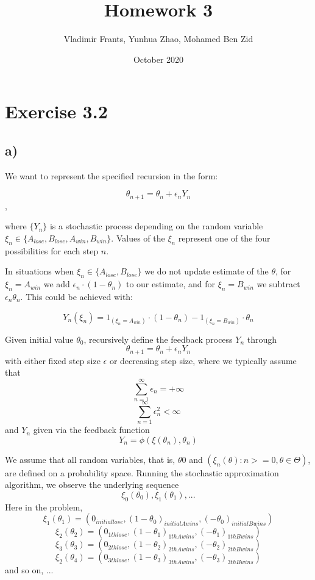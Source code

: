 \documentclass{article}
\title{Homework 3}
\author{Vladimir Frants, Yunhua Zhao, Mohamed Ben Zid}
\date{October 2020}
\begin{document}
\maketitle

\section{Exercise 3.2}

\subsection{a)} 

We want to represent the specified recursion in the form:

$$\theta_{n+1} = \theta_{n} + \epsilon_{n}Y_{n}$$, 

where $\{Y_{n}\}$ is a stochastic process depending on the random variable $\xi_{n}\in\{A_{lose}, B_{lose}, A_{win}, B_{win}\}$. Values of the $\xi_n$ represent one of the four possibilities for each step $n$.

In situations when $\xi_n\in\{A_{lose}, B_{lose}\}$ we do not update estimate of the $\theta$, for $\xi_n=A_{win}$ we add $\epsilon_{n}\cdot(1-\theta_{n})$ to our estimate, and for $\xi_{n}=B_{win}$ we subtract $\epsilon_n\theta_{n}$. This could be achieved with:

$$Y_{n}(\xi_{n})=\mathrm{1}_{(\xi_{n}=A_{win})}\cdot(1-\theta_{n}) - \mathrm{1}_{(\xi_{n}=B_{win})}\cdot\theta_{n}$$


Given initial value $\theta_0$, recursively define the feedback process ${Y_n}$ through $$ \theta_{n+1} = \theta_n+\epsilon_nY_n $$
with either fixed step size $\epsilon$ or decreasing step size, where we typically assume that 
$$ \sum_{n=1}^{\infty}\epsilon_n = +\infty $$
$$ \sum_{n=1}^{\infty}\epsilon_n^2 < \infty $$
and $Y_n$ given via the feedback function
$$ Y_n = \phi(\xi(\theta_n),\theta_n) $$
 
We assume that all random variables, that is, $\theta0$ and $ ({\xi_n(\theta):n>=0, \theta\in\Theta}) $, are defined on a probability
space. Running the stochastic approximation algorithm, we observe the underlying
sequence
$$ \xi_0(\theta_0), \xi_1(\theta_1),... $$ 
Here in the problem, 
$$ \xi_1(\theta_1) = (0_{initial lose},(1-\theta_{0})_{initial A wins}, (-\theta_{0})_{initial B wins}) $$
$$ \xi_2(\theta_2) = (0_{1th lose},(1-\theta_{1})_{1th A wins}, (-\theta_{1})_{1th B wins}) $$
$$ \xi_3(\theta_3) = (0_{2th lose},(1-\theta_{2})_{2th A wins}, (-\theta_{2})_{2th B wins}) $$
$$ \xi_2(\theta_4) = (0_{3th lose},(1-\theta_{3})_{3th A wins}, (-\theta_{3})_{3th B wins}) $$
and so on, ...  \\
\end{document}

